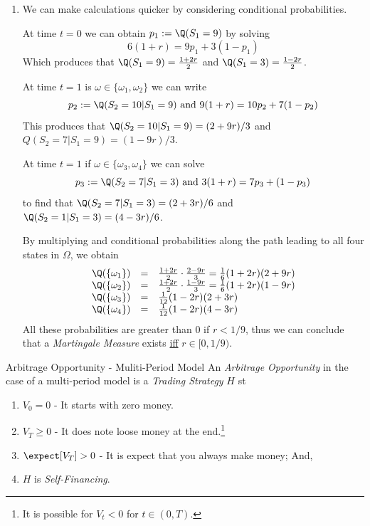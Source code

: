 \documentclass[11pt,a4paper]{article}
\begin{document}
\begin{example}{}
\begin{enumerate}
      \item We can make calculations quicker by considering conditional probabilities.
      \par At time $t=0$ we can obtain $p_1:=\Q(S_1=9)$ by solving
      \[ 6(1+r)=9p_1+3(1-p_1) \]
      Which produces that $\Q(S_1=9)=\frac{1+2r}2$ and $\Q(S_1=3)=\frac{1-2r}2$.
      \par At time $t=1$ is $\omega\in\{\omega_1,\omega_2\}$ we can write
      \[ p_2:=\Q(S_2=10|S_1=9)\text{ and }9(1+r)=10p_2+7(1-p_2) \]
      This produces that $\Q(S_2=10|S_1=9)=(2+9r)/3$ and $Q(S_2=7|S_1=9)=(1-9r)/3$.
      \par At time $t=1$ if $\omega\in\{\omega_3,\omega_4\}$ we can solve
      \[ p_3:=\Q(S_2=7|S_1=3)\text{ and }3(1+r)=7p_3+(1-p_3) \]
      to find that $\Q(S_2=7|S_1=3)=(2+3r)/6$ and $\Q(S_2=1|S_1=3)=(4-3r)/6$.
      \par By multiplying and conditional probabilities along the path leading to all four states in $\Omega$, we obtain
      \[\begin{array}{rcl}
        \Q(\{\omega_1\})&=&\frac{1+2r}2\cdot\frac{2-9r}3=\frac16(1+2r)(2+9r)\\
        \Q(\{\omega_2\})&=&\frac{1+2r}2\cdot\frac{1-9r}3=\frac16(1+2r)(1-9r)\\
        \Q(\{\omega_3\})&=&\frac1{12}(1-2r)(2+3r)\\
        \Q(\{\omega_4\})&=&\frac1{12}(1-2r)(4-3r)
      \end{array}\]
      All these probabilities are greater than 0 if $r<1/9$, thus we can conclude that a \textit{Martingale Measure} exists \underline{iff} $r\in[0,1/9)$.
    \end{enumerate}
  \end{example}

  \begin{definition}{Arbitrage Opportunity - Muliti-Period Model}
    An \textit{Arbitrage Opportunity} in the case of a multi-period model is a \textit{Trading Strategy} $H$ st
    \begin{enumerate}
      \item $V_0=0$ - It starts with zero money.
      \item $V_T\geq0$ - It does note loose money at the end.\footnote{It is possible for $V_t<0$ for $t\in(0,T)$.}
      \item $\expect[V_T]>0$ - It is expect that you always make money; And,
      \item $H$ is \textit{Self-Financing}.
    \end{enumerate}
  \end{definition}
\end{document}
